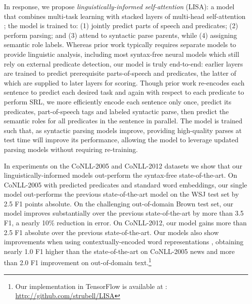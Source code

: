 \documentclass[11pt,a4paper]{article}
\newcommand{\todo}[1]{\textcolor{red}{TODO: #1}}
\begin{document}
In response, we propose \emph{linguistically-informed self-attention} (LISA): a model that combines multi-task learning \citep{caruana1993multitask} with stacked layers of multi-head self-attention \citep{vaswani2017attention}; the model is trained to: (1) jointly predict parts of speech and predicates; (2) perform parsing; and (3) attend to syntactic parse parents, while (4) assigning semantic role labels. Whereas prior work typically requires separate models to provide linguistic analysis, including most syntax-free neural models which still rely on external predicate detection, our model is truly end-to-end: earlier layers are trained to predict prerequisite parts-of-speech and predicates, the latter of which are supplied to later layers for scoring. Though prior work re-encodes each sentence to predict each desired task and again with respect to each predicate to perform SRL,
we more efficiently encode each sentence only once, predict its predicates, part-of-speech tags and labeled syntactic parse, then predict the semantic roles for all predicates in the sentence in parallel. The model is trained such that, as syntactic parsing models improve, providing high-quality parses at test time will improve its performance, allowing the model to leverage updated parsing models without requiring re-training. 

In experiments on the CoNLL-2005 and CoNLL-2012 datasets we show that our linguistically-informed models out-perform the syntax-free state-of-the-art. On CoNLL-2005 with predicted predicates and standard word embeddings, our single model out-performs the previous state-of-the-art model on the WSJ test set by 2.5 F1 points absolute. On the challenging out-of-domain Brown test set, our model improves substantially over the previous state-of-the-art by more than 3.5 F1, a nearly 10\% reduction in error. On CoNLL-2012, our model gains more than 2.5 F1 absolute over the previous state-of-the-art. Our models also show improvements when using contextually-encoded word representations \citep{peters2018deep}, obtaining nearly 1.0 F1 higher than the state-of-the-art on CoNLL-2005 news and more than 2.0 F1 improvement on out-of-domain text.\footnote{Our implementation in TensorFlow \citep{abadi2015tensorflow} is available at : \protect\url{http://github.com/strubell/LISA}}
\end{document}
